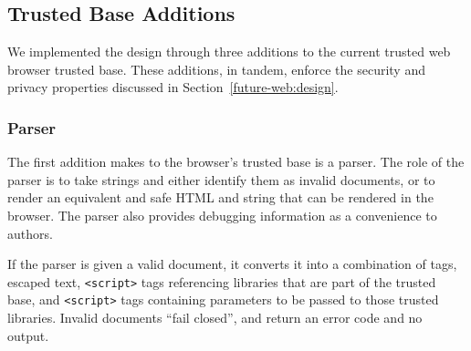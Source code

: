 \subsection{Trusted Base Additions}
We implemented the \CDF design through three additions to the current trusted
web browser trusted base.  These additions, in tandem, enforce the security and
privacy properties discussed in Section~\ref{future-web:design}.

\subsubsection{Parser}
The first addition \CDF makes to the browser's trusted base is a \CDF parser.
The role of the \CDF parser is to take strings and either identify them as
invalid \CDF documents, or to render an equivalent and safe HTML and \JS string that
can be rendered in the browser. The parser also provides debugging
information as a convenience to \CDF authors.

If the parser is given a valid \CDF document, it converts it into a combination
of \HTML tags, escaped text, \texttt{<script>} tags referencing \JS libraries
that are part of the \CDF trusted base, and \texttt{<script>} tags containing
parameters to be passed to those trusted libraries.  Invalid documents
``fail closed'', and return an error code and no output.

